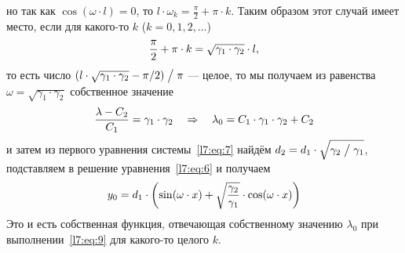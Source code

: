 \documentclass[12pt,a4paper,openany,fleqn]{book}
\theoremstyle{definition}
\begin{document}
	но так как $\cos(\omega\cdot l)=0$, то $l\cdot\omega_k=\displaystyle\frac{\pi}{2}+\pi\cdot k$. Таким образом этот случай имеет место, если для какого-то $k$ ($k=0,1,2,\ldots$)
	\begin{equation}
		\label{l7:eq:9}
		\hfill\frac{\pi}{2}+\pi\cdot k=\sqrt{\gamma_1\cdot\gamma_2}\cdot l,\hfill
	\end{equation} 
	то есть число $(l\cdot\sqrt{\gamma_1\cdot\gamma_2}-\pi/2)\bigm/\pi$ --- целое, то мы получаем из равенства $\omega=\sqrt{\gamma_1\cdot\gamma_2}$ собственное значение 
	\begin{equation*}
		\hfill\frac{\lambda-C_2}{C_1}=\gamma_1\cdot\gamma_2\quad\Rightarrow\quad\lambda_0=C_1\cdot\gamma_1\cdot\gamma_2+C_2\hfill
	\end{equation*}
	и затем из первого уравнения системы~\eqref{l7:eq:7} найдём $d_2=d_1\cdot\sqrt{\gamma_2\bigm/\gamma_1}$, подставляем в решение уравнения~\eqref{l7:eq:6} и получаем 
	\begin{equation*}
		\hfill y_0=d_1\cdot\left(\sin(\omega\cdot x)+\sqrt{\frac{\gamma_2}{\gamma_1}}\cdot\cos(\omega\cdot x)\right)\hfill
	\end{equation*}
	Это и есть собственная функция, отвечающая собственному значению $\lambda_0$ при выполнении~\eqref{l7:eq:9} для какого-то целого $k$. 
	
\end{document}
